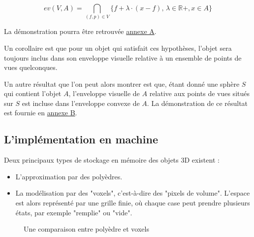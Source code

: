 \documentclass[a4paper]{article}
\begin{document}
      \[
      ev(V, A) = \bigcap_{(f, p) \in V} \{f + \lambda \cdot (x - f), \, \lambda \in \mathbb{R}+, x \in A\}
      \]

      La démonstration pourra être retrouvée \hyperref[AnnexeA]{annexe A}.

      Un corollaire est que pour un objet qui satisfait ces hypothèses, l'objet sera toujours inclus dans son enveloppe visuelle relative à un ensemble de points de vues quelconques.

      Un autre résultat que l'on peut alors montrer est que, étant donné une sphère $S$ qui contient l'objet $A$, l'enveloppe visuelle de $A$ relative aux points de vues situés sur $S$ est  incluse dans l'enveloppe convexe de $A$. La démonstration de ce résultat est fournie en \hyperref[AnnexeB]{annexe B}.

    \subsection{L'implémentation en machine}
      Deux principaux types de stockage en mémoire des objets 3D existent :
      \begin{itemize}
        \item L'approximation par des polyèdres.
        \item La modélisation par des "voxels", c'est-à-dire des "pixels de volume". L'espace est alors représenté par une grille finie, où chaque case peut prendre plusieurs états, par exemple "remplie" ou "vide".
      \end{itemize}
      \begin{figure}[h]%
          \centering
          \qquad
          \caption{Une comparaison entre polyèdre et voxels}%
          \label{voxpoly}%
      \end{figure}
\end{document}
